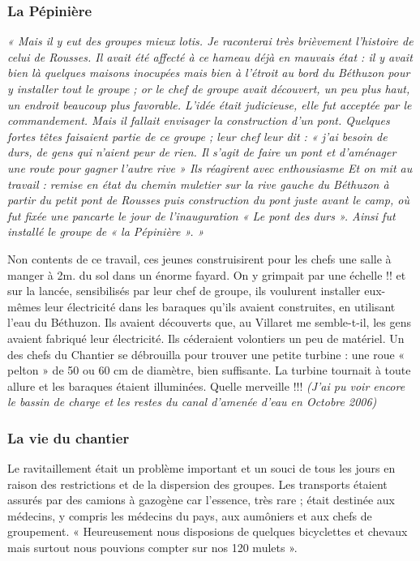 \subsubsection{La Pépinière}

\emph{« Mais il y eut des groupes mieux lotis. Je raconterai très brièvement l’histoire de
celui de Rousses. Il avait été affecté à ce hameau déjà en mauvais état : il y avait
bien là quelques maisons inocupées mais bien à l’étroit au bord du Béthuzon pour y
installer tout le groupe ; or le chef de groupe avait découvert, un peu plus haut, un
endroit beaucoup plus favorable. L’idée était judicieuse, elle fut acceptée par le
commandement. Mais il fallait envisager la construction d’un pont. Quelques fortes
têtes faisaient partie de ce groupe ; leur chef leur dit : « j’ai besoin de durs, de gens
qui n’aient peur de rien. Il s’agit de faire un pont et d’aménager une route pour
gagner l’autre rive » Ils réagirent avec enthousiasme Et on mit au travail :
remise en état du chemin muletier sur la rive gauche du Béthuzon à partir du petit
pont de Rousses puis construction du pont juste avant le camp, où fut fixée une
pancarte le jour de l’inauguration « Le pont des durs ». Ainsi fut installé le groupe
de « la Pépinière ». »}

Non contents de ce travail, ces jeunes construisirent pour les chefs une salle à
manger à 2m. du sol dans un énorme fayard. On y grimpait par une échelle !! et sur
la lancée, sensibilisés par leur chef de groupe, ils voulurent installer eux-mêmes leur
électricité dans les baraques qu’ils avaient construites, en utilisant l’eau du
Béthuzon. Ils avaient découverts que, au Villaret me semble-t-il, les gens avaient
fabriqué leur électricité. Ils céderaient volontiers un peu de matériel. Un des chefs
du Chantier se débrouilla pour trouver une petite turbine : une roue « pelton » de 50
ou 60 cm de diamètre, bien suffisante. La turbine tournait à toute allure et les
baraques étaient illuminées. Quelle merveille !!! \emph{(J’ai pu voir encore le bassin de
charge et les restes du canal d’amenée d’eau en Octobre 2006)}

\subsubsection{La vie du chantier}

Le ravitaillement était un problème important et un souci de tous les jours en raison
des restrictions et de la dispersion des groupes.
Les transports étaient assurés par des camions à gazogène car l’essence, très rare ;
était destinée aux médecins, y compris les médecins du pays, aux aumôniers et aux
chefs de groupement. « Heureusement nous disposions de quelques bicyclettes et
chevaux mais surtout nous pouvions compter sur nos 120 mulets ».

